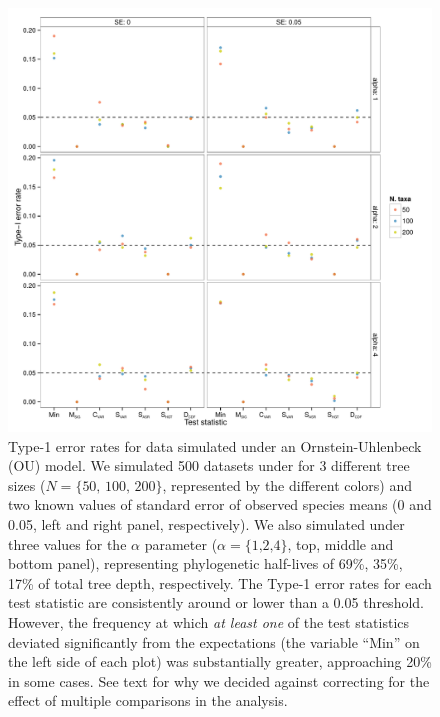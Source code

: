 \documentclass[12pt,twoside]{article}
\begin{document}
\begin{figure}[p]
  \centering
  \includegraphics[width=\textwidth]{figs/ou-sim-res}
  \caption[Type-1 error rates for OU simulations]{Type-1 error rates for data simulated under an Ornstein-Uhlenbeck (OU) model. We simulated 500 datasets under for 3 different tree sizes ($N=\lbrace \text{50, 100, 200} \rbrace$, represented by the different colors) and two known values of standard error of observed species means (0 and 0.05, left and right panel, respectively). We also simulated under three values for the $\alpha$ parameter ($\alpha=\lbrace \text{1,2,4} \rbrace$, top, middle and bottom panel), representing phylogenetic half-lives of 69\%, 35\%, 17\% of total tree depth, respectively.  The Type-1 error rates for each test statistic are consistently around or lower than a 0.05 threshold. However, the frequency at which \emph{at least one} of the test statistics deviated significantly from the expectations (the variable ``Min'' on the left side of each plot) was substantially greater, approaching 20\% in some cases. See text for why we decided against correcting for the effect of multiple comparisons in the analysis.}
  \label{fig:ou-sim}
\end{figure}
\end{document}
